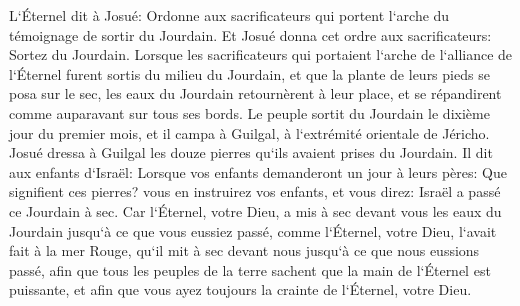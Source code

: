 \verse L`Éternel dit à Josué: 
\verse Ordonne aux sacrificateurs qui portent l`arche du témoignage de sortir du Jourdain. 
\verse Et Josué donna cet ordre aux sacrificateurs: Sortez du Jourdain. 
\verse Lorsque les sacrificateurs qui portaient l`arche de l`alliance de l`Éternel furent sortis du milieu du Jourdain, et que la plante de leurs pieds se posa sur le sec, les eaux du Jourdain retournèrent à leur place, et se répandirent comme auparavant sur tous ses bords. 
\verse Le peuple sortit du Jourdain le dixième jour du premier mois, et il campa à Guilgal, à l`extrémité orientale de Jéricho. 
\verse Josué dressa à Guilgal les douze pierres qu`ils avaient prises du Jourdain. 
\verse Il dit aux enfants d`Israël: Lorsque vos enfants demanderont un jour à leurs pères: Que signifient ces pierres? 
\verse vous en instruirez vos enfants, et vous direz: Israël a passé ce Jourdain à sec. 
\verse Car l`Éternel, votre Dieu, a mis à sec devant vous les eaux du Jourdain jusqu`à ce que vous eussiez passé, comme l`Éternel, votre Dieu, l`avait fait à la mer Rouge, qu`il mit à sec devant nous jusqu`à ce que nous eussions passé, 
\verse afin que tous les peuples de la terre sachent que la main de l`Éternel est puissante, et afin que vous ayez toujours la crainte de l`Éternel, votre Dieu. 

\chapter{}

